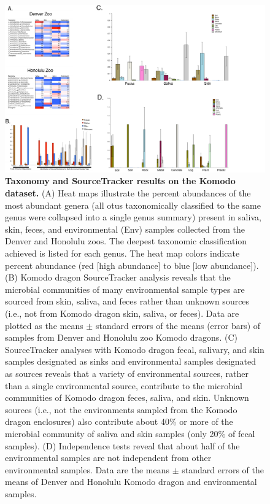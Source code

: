 \begin{figure}[htbp]
\includegraphics[width=1.15\columnwidth]{chapter_contributions_figures/KomodoSTest.pdf}
\caption[Taxonomy and SourceTracker results on the Komodo dataset]{\textbf{Taxonomy and SourceTracker results on the Komodo dataset.}
(A) Heat maps illustrate the percent abundances of the most abundant genera
(all \gls{otu}s taxonomically classified to the same genus were collapsed into
a single genus summary) present in saliva, skin, feces, and environmental (Env)
samples collected from the Denver and Honolulu zoos. The deepest taxonomic
classification achieved is listed for each genus. The heat map colors indicate
percent abundance (red [high abundance] to blue [low abundance]). (B) Komodo
dragon SourceTracker analysis reveals that the microbial communities of many
environmental sample types are sourced from skin, saliva, and feces rather than
unknown sources (i.e., not from Komodo dragon skin, saliva, or feces). Data are
plotted as the means $\pm$ standard errors of the means (error bars) of samples
from Denver and Honolulu zoo Komodo dragons. (C) SourceTracker analyses with
Komodo dragon fecal, salivary, and skin samples designated as sinks and environmental
samples designated as sources reveals that a variety of environmental sources,
rather than a single environmental source, contribute to the microbial communities
of Komodo dragon feces, saliva, and skin. Unknown sources (i.e., not the environments
sampled from the Komodo dragon enclosures) also contribute about 40\% or more of
the microbial community of saliva and skin samples (only 20\% of fecal samples).
(D) Independence tests reveal that about half of the environmental samples are not
independent from other environmental samples. Data are the means $\pm$ standard errors
of the means of Denver and Honolulu Komodo dragon and environmental samples.}
\label{KomodoST}
\end{figure}

